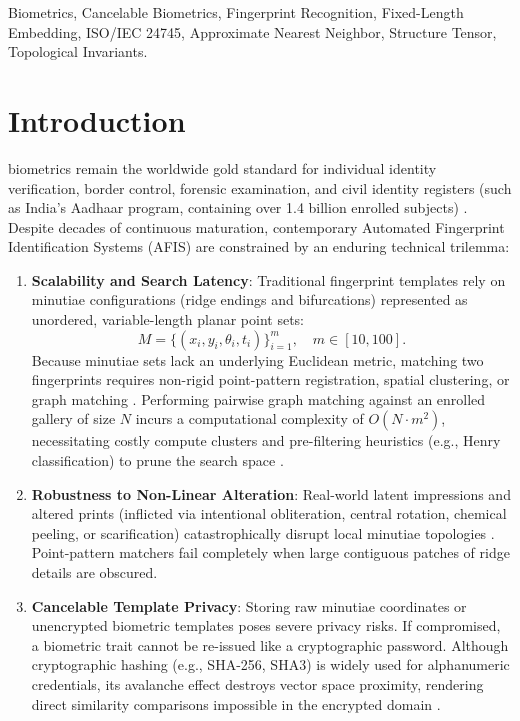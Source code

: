 \documentclass[lettersize,journal]{IEEEtran}
\begin{document}
\begin{IEEEkeywords}
Biometrics, Cancelable Biometrics, Fingerprint Recognition, Fixed-Length Embedding, ISO/IEC 24745, Approximate Nearest Neighbor, Structure Tensor, Topological Invariants.
\end{IEEEkeywords}

\section{Introduction}
 biometrics remain the worldwide gold standard for individual identity verification, border control, forensic examination, and civil identity registers (such as India's Aadhaar program, containing over 1.4 billion enrolled subjects) \cite{b1, b45}. Despite decades of continuous maturation, contemporary Automated Fingerprint Identification Systems (AFIS) are constrained by an enduring technical trilemma:
\begin{enumerate}
    \item \textbf{Scalability and Search Latency}: Traditional fingerprint templates rely on minutiae configurations (ridge endings and bifurcations) represented as unordered, variable-length planar point sets:
    \begin{equation}
        M = \{(x_i, y_i, \theta_i, t_i)\}_{i=1}^m, \quad m \in [10, 100].
    \end{equation}
    Because minutiae sets lack an underlying Euclidean metric, matching two fingerprints requires non-rigid point-pattern registration, spatial clustering, or graph matching \cite{b2, b27}. Performing pairwise graph matching against an enrolled gallery of size $N$ incurs a computational complexity of $O(N \cdot m^2)$, necessitating costly compute clusters and pre-filtering heuristics (e.g., Henry classification) to prune the search space \cite{b1, b40}.
    \item \textbf{Robustness to Non-Linear Alteration}: Real-world latent impressions and altered prints (inflicted via intentional obliteration, central rotation, chemical peeling, or scarification) catastrophically disrupt local minutiae topologies \cite{b34, b36}. Point-pattern matchers fail completely when large contiguous patches of ridge details are obscured.
    \item \textbf{Cancelable Template Privacy}: Storing raw minutiae coordinates or unencrypted biometric templates poses severe privacy risks. If compromised, a biometric trait cannot be re-issued like a cryptographic password. Although cryptographic hashing (e.g., SHA-256, SHA3) is widely used for alphanumeric credentials, its avalanche effect destroys vector space proximity, rendering direct similarity comparisons impossible in the encrypted domain \cite{b39, b43}.
\end{enumerate}
\end{document}
